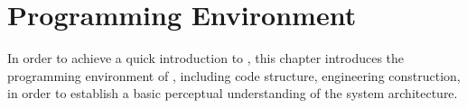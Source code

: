 \begin{savequote}[45mm]
\end{savequote}


\chapter{Programming Environment} 
\label{ch:prog-env}

\begin{content}
In order to achieve a quick introduction to \tf{}, this chapter introduces the programming environment of \tf{}, including code structure, engineering construction, in order to establish a basic perceptual understanding of the \tf{} system architecture.
\end{content}


